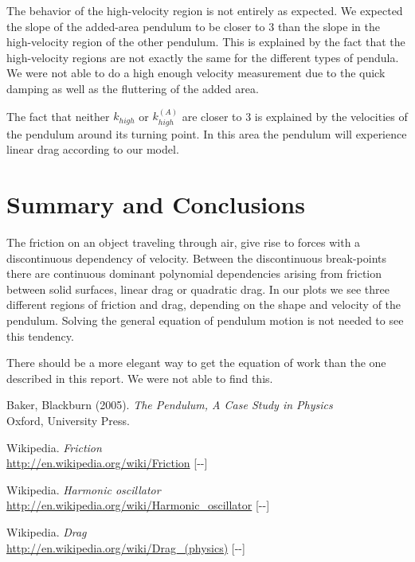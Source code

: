 \documentclass[11pt, a4paper]{article}
\newcommand{\todayswe}{\the\year-\twodigit\month-\twodigit\day}
\begin{document}
The behavior of the high-velocity region is not entirely as expected. 
We expected the slope of the added-area pendulum to be closer to $3$ than the slope in the high-velocity region of the other pendulum.
This is explained by the fact that the high-velocity regions are not exactly the same for the different types of pendula. 
We were not able to do a high enough velocity measurement due to the quick damping as well as the fluttering of the added area.

The fact that neither $k_{high}$ or $k_{high}^{(A)}$ are closer to 3 is explained by the velocities of the pendulum around its turning point.
In this area the pendulum will experience linear drag according to our model. 
 
 \section{Summary and Conclusions}
The friction on an object traveling through air, give rise to forces with a discontinuous dependency of velocity.
Between the discontinuous break-points there are continuous dominant polynomial dependencies arising from friction between solid surfaces, linear drag or quadratic drag.
In our plots we see three different regions of friction and drag, depending on the shape and velocity of the pendulum. 
Solving the general equation of pendulum motion is not needed to see this tendency.

There should be a more elegant way to get the equation of work than the one described in this report. 
We were not able to find this.

\vfill

\begin{thebibliography}{99}

   Baker, Blackburn (2005). 
  \textit{The Pendulum, A Case Study in Physics}\\
  Oxford, University Press.

   Wikipedia. \textit{Friction}\\ 
  \url{http://en.wikipedia.org/wiki/Friction} [\todayswe]
	
   Wikipedia. \textit{Harmonic oscillator}\\ 
  \url{http://en.wikipedia.org/wiki/Harmonic_oscillator} [\todayswe]

   Wikipedia. \textit{Drag}\\ 
  \url{http://en.wikipedia.org/wiki/Drag_(physics)} [\todayswe]

\end{thebibliography}

\begin{appendix}
\end{appendix}

\end{document}
